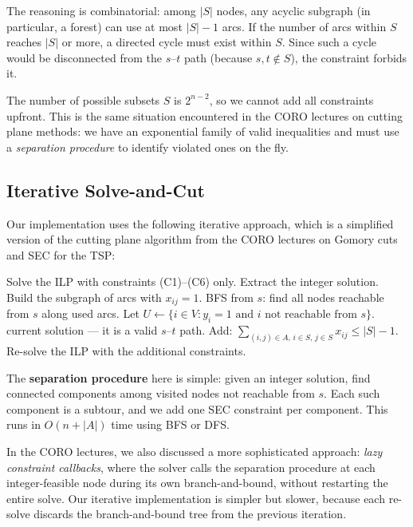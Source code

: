\documentclass[12pt, a4paper]{article}
\begin{document}
The reasoning is combinatorial: among $|S|$ nodes, any acyclic subgraph (in
particular, a forest) can use at most $|S|-1$ arcs. If the number of arcs within $S$
reaches $|S|$ or more, a directed cycle must exist within $S$. Since such a cycle
would be disconnected from the $s$--$t$ path (because $s,t \notin S$), the
constraint forbids it.

The number of possible subsets $S$ is $2^{n-2}$, so we cannot add all constraints
upfront. This is the same situation encountered in the CORO lectures on cutting
plane methods: we have an exponential family of valid inequalities and must use a
\emph{separation procedure} to identify violated ones on the fly.

\subsection{Iterative Solve-and-Cut}

Our implementation uses the following iterative approach, which is a simplified
version of the cutting plane algorithm from the CORO lectures on Gomory cuts and
SEC for the TSP:

\begin{algorithm}[H]
\caption{Iterative SEC generation}
\begin{algorithmic}[1]
\State Solve the ILP with constraints (C1)--(C6) only.
\Loop
  \State Extract the integer solution. Build the subgraph of arcs with $x_{ij} = 1$.
  \State BFS from $s$: find all nodes reachable from $s$ along used arcs.
  \State Let $U \leftarrow \{i \in V : y_i = 1 \text{ and } i \text{ not reachable
         from } s\}$.
    \State \Return current solution --- it is a valid $s$--$t$ path.
  \EndIf
    \State Add: $\displaystyle\sum_{(i,j) \in A,\, i \in S,\, j \in S}
           x_{ij} \leq |S| - 1$.
  \EndFor
  \State Re-solve the ILP with the additional constraints.
\EndLoop
\end{algorithmic}
\end{algorithm}

The \textbf{separation procedure} here is simple: given an integer solution, find
connected components among visited nodes not reachable from $s$. Each such component
is a subtour, and we add one SEC constraint per component. This runs in $O(n + |A|)$
time using BFS or DFS.

In the CORO lectures, we also discussed a more sophisticated approach:
\emph{lazy constraint callbacks}, where the solver calls the separation procedure at
each integer-feasible node during its own branch-and-bound, without restarting the
entire solve. Our iterative implementation is simpler but slower, because each
re-solve discards the branch-and-bound tree from the previous iteration.
\end{document}
